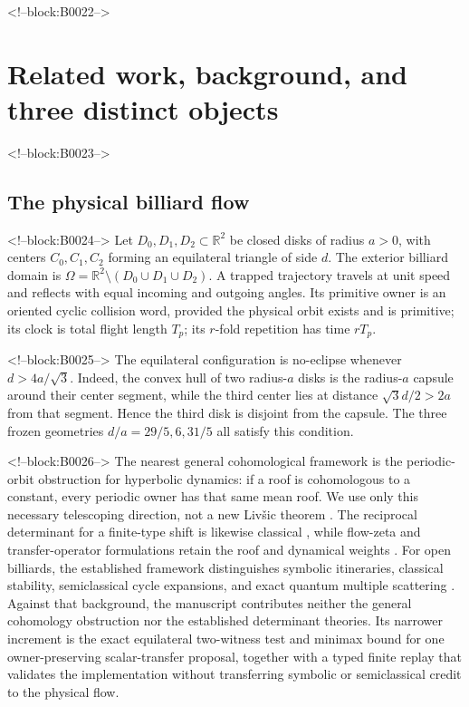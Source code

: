\documentclass[11pt,a4paper]{article}
\theoremstyle{definition}
\theoremstyle{remark}
\begin{document}
<!--block:B0022-->
\section{Related work, background, and three distinct objects}

<!--block:B0023-->
\subsection{The physical billiard flow}

<!--block:B0024-->
Let \(D_0,D_1,D_2\subset\mathbb R^2\) be closed disks of radius \(a>0\), with centers \(C_0,C_1,C_2\) forming an equilateral triangle of side \(d\). The exterior billiard domain is
\(\Omega=\mathbb R^2\setminus(D_0\cup D_1\cup D_2)\). A trapped trajectory travels at unit speed and reflects with equal incoming and outgoing angles. Its primitive owner is an oriented cyclic collision word, provided the physical orbit exists and is primitive; its clock is total flight length \(T_p\); its \(r\)-fold repetition has time \(rT_p\).

<!--block:B0025-->
The equilateral configuration is no-eclipse whenever \(d>4a/\sqrt3\).
Indeed, the convex hull of two radius-\(a\) disks is the radius-\(a\)
capsule around their center segment, while the third center lies at distance
\(\sqrt3d/2>2a\) from that segment.  Hence the third disk is disjoint from
the capsule.  The three frozen geometries \(d/a=29/5,6,31/5\) all satisfy
this condition.

<!--block:B0026-->
The nearest general cohomological framework is the periodic-orbit obstruction for hyperbolic dynamics: if a roof is cohomologous to a constant, every periodic owner has that same mean roof. We use only this necessary telescoping direction, not a new Liv\v{s}ic theorem \citep[main cohomology criteria]{Livsic1972}.%
The reciprocal determinant for a finite-type shift is likewise classical \citep[pp.~43--49]{BowenLanford1970},%
while flow-zeta and transfer-operator formulations retain the roof and dynamical weights \citep[Secs.~1--3]{Ruelle1976}.%
For open billiards, the established framework distinguishes symbolic itineraries, classical stability, semiclassical cycle expansions, and exact quantum multiple scattering \citep[Secs.~2--6]{Wirzba1999}.%
Against that background, the manuscript contributes neither the general cohomology obstruction nor the established determinant theories. Its narrower increment is the exact equilateral two-witness test and minimax bound for one owner-preserving scalar-transfer proposal, together with a typed finite replay that validates the implementation without transferring symbolic or semiclassical credit to the physical flow.
\end{document}

